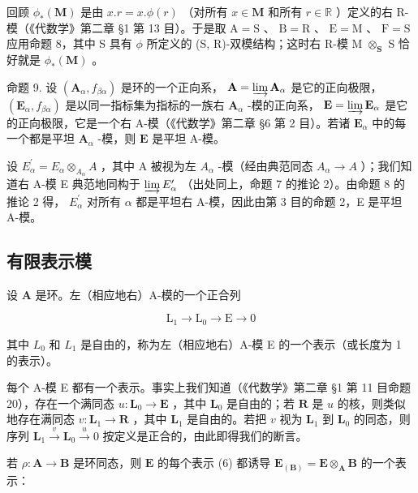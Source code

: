 回顾 \(\phi_{*}(\mathbf{M})\) 是由 \(x.r = x.\phi (r)\) （对所有 \(x\in \mathbf{M}\) 和所有 \(r\in \mathbb{R}\) ）定义的右 R-模（《代数学》第二章 §1 第 13 目）。于是取 \(\mathrm{A} = \mathrm{S}\) 、 \(\mathrm{B} = \mathrm{R}\) 、 \(\mathrm{E} = \mathrm{M}\) 、 \(\mathrm{F} = \mathrm{S}\) 应用命题 8，其中 S 具有 \(\phi\) 所定义的 (S, R)-双模结构；这时右 R-模 M \(\otimes_{\mathbf{S}}\) S 恰好就是 \(\phi_{*}(\mathbf{M})\) 。

命题 9. 设 \((\mathbf{A}_{\alpha}, f_{\beta \alpha})\) 是环的一个正向系， \(\mathbf{A} = \varinjlim \mathbf{A}_{\alpha}\) 是它的正向极限， \((\mathbf{E}_{\alpha}, f_{\beta \alpha})\) 是以同一指标集为指标的一族右 \(\mathbf{A}_{\alpha}\) -模的正向系， \(\mathbf{E} = \varinjlim \mathbf{E}_{\alpha}\) 是它的正向极限，它是一个右 A-模（《代数学》第二章 §6 第 2 目）。若诸 \(\mathbf{E}_{\alpha}\) 中的每一个都是平坦 \(\mathbf{A}_{\alpha}\) -模，则 \(\mathbf{E}\) 是平坦 A-模。

设 \(E_{\alpha}^{\prime}=E_{\alpha}\otimes_{A_{\alpha}}A\) ，其中 A 被视为左 \(A_{\alpha}\) -模（经由典范同态 \(A_{\alpha}\to A\) ）；我们知道右 A-模 E 典范地同构于 \(\varinjlim E_{\alpha}^{\prime}\) （出处同上，命题 7 的推论 2）。由命题 8 的推论 2 得， \(E_{\alpha}^{\prime}\) 对所有 \(\alpha\) 都是平坦右 A-模，因此由第 3 目的命题 2，E 是平坦 A-模。

\subsection{有限表示模}

设 \(\mathbf{A}\) 是环。左（相应地右）A-模的一个正合列

\[
\mathrm{L} _ {1} \rightarrow \mathrm{L} _ {0} \rightarrow \mathrm{E} \rightarrow 0\tag{6}
\]

其中 \(L_{0}\) 和 \(L_{1}\) 是自由的，称为左（相应地右）A-模 E 的一个表示（或长度为 1 的表示）。

每个 A-模 E 都有一个表示。事实上我们知道（《代数学》第二章 §1 第 11 目命题 20），存在一个满同态 \(u \colon \mathbf{L}_0 \to \mathbf{E}\) ，其中 \(\mathbf{L}_0\) 是自由的；若 \(\mathbf{R}\) 是 \(u\) 的核，则类似地存在满同态 \(v \colon \mathbf{L}_1 \to \mathbf{R}\) ，其中 \(\mathbf{L}_1\) 是自由的。若把 \(v\) 视为 \(\mathbf{L}_1\) 到 \(\mathbf{L}_0\) 的同态，则序列 \(\mathbf{L}_1 \xrightarrow{v} \mathbf{L}_0 \xrightarrow{u} 0\) 按定义是正合的，由此即得我们的断言。

若 \(\rho: \mathbf{A} \to \mathbf{B}\) 是环同态，则 \(\mathbf{E}\) 的每个表示 (6) 都诱导 \(\mathbf{E}_{(\mathbf{B})} = \mathbf{E} \otimes_{\mathbf{A}} \mathbf{B}\) 的一个表示：

